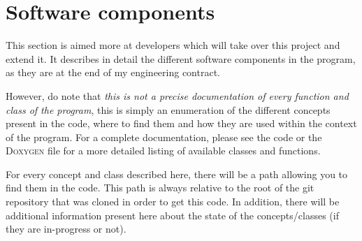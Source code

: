 \chapter{Software components}\label{text:03_software_components}

\begin{comment}
	What are the major software components of the program, what is(are) their role(s)
		- Image representation in memory
			- Old way : DiscreteGrid
			- New way : Grid<ImageBackendImpl>
		- Visualization primitives
			- Viewers : 3D and 2D
			- Scene
			- The different components of the scene, more detailed
		- Generation primitives
		- Tasks / multi-threaded stuff
		- General purpose / other things that didn't fit into above
\end{comment}

This section is aimed more at developers which will take over this project and extend it. It describes in detail the different software components in the program, as they are at the end of my engineering contract.

\vspace{\baselineskip}

However, do note that \textit{this is not a precise documentation of every function and class of the program}, this is simply an enumeration of the different concepts present in the code, where to find them and how they are used within the context of the program. For a complete documentation, please see the code or the \textsc{Doxygen} file for a more detailed listing of available classes and functions.

\vspace{\baselineskip}

For every concept and class described here, there will be a path allowing you to find them in the code. This path is always relative to the root of the git repository that was cloned in order to get this code. In addition, there will be additional information present here about the state of the concepts/classes (if they are in-progress or not).

